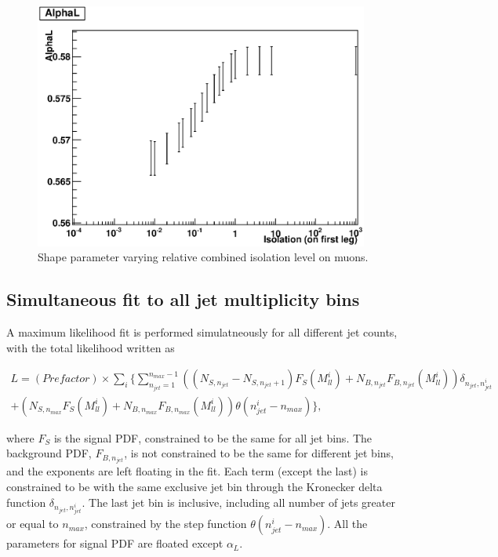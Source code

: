 \documentclass{cmspaper}
\begin{document}
\begin{figure}
   \begin{center}
   \includegraphics[width=110mm]{AlphaLVsIsolation_ReasonableIsolation}
   \caption{Shape parameter varying relative combined isolation level on muons.}
   \label{Figure_AlphaLVsIsolation}
   \end{center}
\end{figure}

\subsection{Simultaneous fit to all jet multiplicity bins}

A maximum likelihood fit is performed simulatneously for all different jet counts, with the total likelihood written as

\begin{eqnarray}
L = (Prefactor) \times \displaystyle\sum_i \{ \displaystyle\sum_{n_{jet}=1}^{n_{max} - 1} \left( (N_{S, n_{jet}} - N_{S, n_{jet} + 1}) F_S(M_{ll}^i) + N_{B, n_{jet}} F_{B, n_{jet}}(M_{ll}^i) \right)
\delta_{n_{jet}, n_{jet}^i}\nonumber\\
+ \left( N_{S, n_{max}} F_S(M_{ll}^i) + N_{B, n_{max}} F_{B, n_{max}}(M_{ll}^i) \right) \theta(n_{jet}^i - n_{max}) \},
\nonumber
\end{eqnarray}

where $F_S$ is the signal PDF, constrained to be the same for all jet bins.  The background PDF, $F_{B, n_{jet}}$, is not constrained to
be the same for different jet bins, and the exponents are left floating in the fit.  Each term (except the last) is constrained to be with the same exclusive jet bin
through the Kronecker delta function $\delta_{n_{jet}, n_{jet}^i}$.
The last jet bin is inclusive, including all number of jets greater or equal to $n_{max}$, constrained by the step function $\theta(n_{jet}^i - n_{max})$.
All the parameters for signal PDF are floated except $\alpha_L$.
\end{document}
